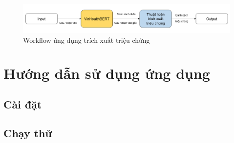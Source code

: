 \documentclass[12pt]{article}
\begin{document}
\begin{figure}
\centering
\includegraphics[scale=.6]{img/workflow.png}
\caption{Workflow ứng dụng trích xuất triệu chứng}
\label{fig:workflow}
\end{figure}

\section{Hướng dẫn sử dụng ứng dụng}
\subsection{Cài đặt}

\subsection{Chạy thử}

\cleardoublepage
{}
{}


\end{document}
